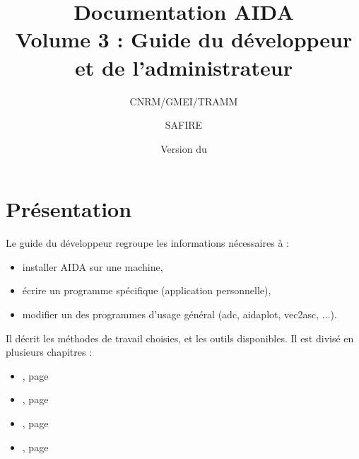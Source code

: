 \documentclass[a4paper,11pt]{article}
\title{Documentation AIDA \\Volume 3 : Guide du développeur et de l'administrateur}
\author{CNRM/GMEI/TRAMM \and SAFIRE}
\date{Version du \DTMusedate{gitdate}}
\begin{document}
\maketitle
\newpage

\tableofcontents
\newpage

\section*{Présentation}
	Le guide du développeur regroupe les informations nécessaires à :
\begin{itemize}
  \item installer AIDA sur une machine,
  \item écrire un programme spécifique (application personnelle),
  \item modifier un des programmes d'usage général (adc, aidaplot, vec2asc, ...).
\end{itemize}
Il décrit les méthodes de travail choisies, et les outils disponibles.
Il est divisé en plusieurs chapitres :
\begin{itemize}
  \item {},    page \pageref{part:install}
  \item {},      page \pageref{part:dev_C}
  \item {}, page \pageref{part:dev_Python}
  \item {},     page \pageref{part:dev_sh}
\end{itemize}












\end{document}
